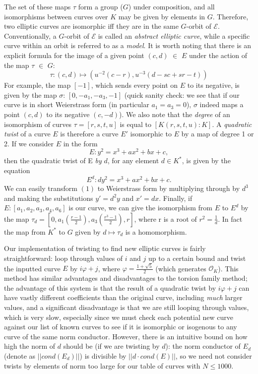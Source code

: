 \noindent The set of these maps $\tau$ form a group ($G$) under composition, and all isomorphisms between curves over $K$ may be given by elements in $G$. Therefore, two elliptic curves are isomorphic iff they are in the same $G$-orbit of $\mathcal{E}$. Conventionally, a $G$-orbit of $\mathcal{E}$ is called an \emph{abstract elliptic curve}, while a specific curve within an orbit is referred to as a \emph{model}. It is worth noting that there is an explicit formula for the image of a given point $(c, d)$ $\in$ $E$ under the action of the map $\tau$ $\in$ $G$:
\begin{equation} \tau: (c, d) \mapsto (u^{-2}(c-r), u^{-3}(d-sc+sr-t)) \nonumber\end{equation}
For example, the map $[-1]$, which sends every point on $E$ to its negative, is given by the map $\sigma$: $[0,-a_1,-a_3,-1]$ (quick sanity check: we see that if our curve is in short Weierstrass form (in particular $a_1 = a_3 = 0$), $\sigma$ indeed maps a point $(c, d)$ to its negative $(c, -d)$). We also note that the \emph{degree} of an isomorphism of curves $\tau = [r,s,t,u]$ is equal to $[K(r,s,t,u) : K]$. A \emph{quadratic twist} of a curve $E$ is therefore a curve $E'$ isomorphic to $E$ by a map of degree 1 or 2. If we consider $E$ in the form
\begin{equation}
E:   y^2 = x^3 + ax^2 + bx + c, \nonumber
\end{equation}
then the quadratic twist of E \emph{by} $d$, for any element $d \in K^*$, is given by the equation
\begin{equation}
E^d:   dy^2 = x^3 + ax^2 + bx + c.
\end{equation}
We can easily transform $(1)$ to Weierstrass form by multiplying through by $d^3$ and making the substitutions $y' = d^2y$ and $x' = dx$. Finally, if $E: [a_1, a_2, a_3, a_4, a_6]$ is our curve, we can give the isomorphism from $E$ to $E^d$ by the map $\tau_d = [0, a_1(\frac{r-1}{2}), a_3(\frac{r^3-1}{2}), r]$, where r is a root of $r^2 = \frac{1}{d}$. In fact the map from $K^*$ to $G$ given by $d \mapsto \tau_d$ is a homomorphism.

Our implementation of twisting to find new elliptic curves is fairly straightforward: loop through values of $i$ and $j$ up to a certain bound and twist the inputted curve $E$ by $i\varphi+j$, where $\varphi = \frac{1+\sqrt{5}}{2}$ (which generates $\mathcal{O}_K$). This method has similar advantages and disadvantages to the torsion family method; the advantage of this system is that the result of a quadratic twist by $i\varphi+j$ can have vastly different coefficients than the original curve, including \emph{much} larger values, and a significant disadvantage is that we are still looping through values, which is very slow, especially since we must check each potential new curve against our list of known curves to see if it is isomorphic or isogenous to any curve of the same norm conductor. However, there is an intuitive bound on how high the norm of $d$ should be (if we are twisting by $d$): the norm conductor of $E_d$ (denote as $||cond(E_d)||$) is divisible by $||d\cdot cond(E)||$, so we need not consider twists by elements of norm too large for our table of curves with $N \leq 1000$.

\
